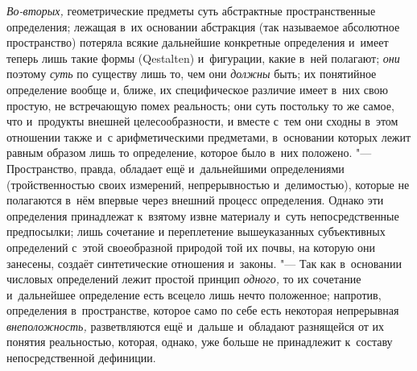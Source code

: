 {\em Во-вторых,}
геометрические предметы суть абстрактные пространственные
определения; лежащая в~их основании абстракция (так называемое абсолютное
пространство) потеряла всякие дальнейшие конкретные определения и~имеет
теперь лишь такие формы (Qestalten) и~фигурации, какие в~ней
полагают; {\em они}
поэтому {\em суть}
по существу лишь то, чем они
{\em должны} быть; их
понятийное определение вообще и, ближе, их специфическое
различие имеет в~них свою простую, не встречающую помех реальность; они
суть постольку то же самое, что и~продукты внешней целесообразности, и
вместе с~тем они сходны в~этом отношении также и~с арифметическими
предметами, в~основании которых лежит равным образом лишь то определение,
которое было в~них положено. "--- Пространство, правда,
обладает ещё и~дальнейшими определениями (тройственностью своих измерений,
непрерывностью и~делимостью), которые не полагаются в~нём впервые через
внешний процесс определения. Однако эти определения принадлежат к~взятому
извне материалу и~суть непосредственные предпосылки; лишь сочетание и
переплетение вышеуказанных субъективных определений с~этой своеобразной
природой той их почвы, на которую они занесены, создаёт синтетические
отношения и~законы. "--- Так как в~основании числовых
определений лежит простой принцип
{\em одного,} то их
сочетание и~дальнейшее определение есть всецело лишь нечто положенное;
напротив, определения в~пространстве, которое само по себе есть некоторая
непрерывная {\em внеположность,}
разветвляются ещё и~дальше и~обладают разнящейся от их
понятия реальностью, которая, однако, уже больше не принадлежит к~составу
непосредственной дефиниции.

